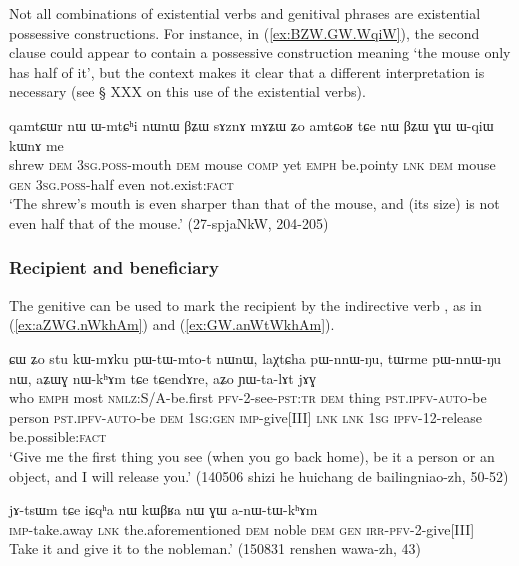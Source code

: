 Not all combinations of existential verbs and genitival phrases are existential possessive constructions. For instance, in (\ref{ex:BZW.GW.WqiW}), the second clause could appear to contain a possessive construction meaning `the mouse only has half of it', but the context makes it clear that a different interpretation is necessary (see § XXX on this use of the existential verbs).

\begin{exe}
\ex \label{ex:BZW.GW.WqiW}
\gll qamtɕɯr nɯ ɯ-mtɕʰi nɯnɯ βʑɯ sɤznɤ mɤʑɯ ʑo amtɕoʁ tɕe nɯ βʑɯ ɣɯ ɯ-qiɯ kɯnɤ me \\
shrew \textsc{dem} \textsc{3sg}.\textsc{poss}-mouth \textsc{dem} mouse \textsc{comp} yet \textsc{emph} be.pointy \textsc{lnk} \textsc{dem} mouse \textsc{gen} \textsc{3sg}.\textsc{poss}-half even not.exist:\textsc{fact} \\
\glt `The shrew's mouth is even sharper than that of the mouse, and (its size) is not even half that of the mouse.' (27-spjaNkW, 204-205)
\end{exe}



 
\subsubsection{Recipient and beneficiary} \label{sec:gen.beneficiary}
 
The genitive can be used to mark the recipient by the indirective verb , as in (\ref{ex:aZWG.nWkhAm}) and (\ref{ex:GW.anWtWkhAm}).   

\begin{exe}
\ex \label{ex:aZWG.nWkhAm}
 \gll ɕɯ ʑo stu kɯ-mɤku pɯ-tɯ-mto-t nɯnɯ, laχtɕha pɯ-nnɯ-ŋu, tɯrme pɯ-nnɯ-ŋu nɯ, aʑɯɣ nɯ-kʰɤm tɕe tɕendɤre, aʑo ɲɯ-ta-lɤt jɤɣ \\
 who \textsc{emph} most \textsc{nmlz}:S/A-be.first \textsc{pfv}-2-see-\textsc{pst}:\textsc{tr} \textsc{dem}  thing \textsc{pst}.\textsc{ipfv}-\textsc{auto}-be   person \textsc{pst}.\textsc{ipfv}-\textsc{auto}-be \textsc{dem} \textsc{1sg}:\textsc{gen} \textsc{imp}-give[III] \textsc{lnk} \textsc{lnk} \textsc{1sg} \textsc{ipfv}-1\fl{}2-release be.possible:\textsc{fact} \\
 \glt `Give me the first thing you see (when you go back home), be it a person or an object, and I will release you.' (140506 shizi he huichang de bailingniao-zh, 50-52)
\end{exe}

\begin{exe}
\ex \label{ex:GW.anWtWkhAm}
 \gll jɤ-tsɯm tɕe iɕqʰa nɯ kɯβʁa nɯ ɣɯ a-nɯ-tɯ-kʰɤm \\
 \textsc{imp}-take.away \textsc{lnk} the.aforementioned \textsc{dem} noble \textsc{dem} \textsc{gen} \textsc{irr}-\textsc{pfv}-2-give[III] \\
 \glt  Take it and give it to the nobleman.' (150831 renshen wawa-zh, 43)
\end{exe}
 
